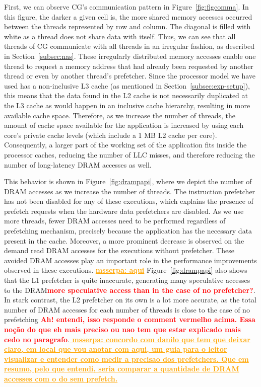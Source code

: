 \documentclass[AMA,final,STIX1COL]{WileyNJD-v2}
\newcommand{\ms}[1]{\textcolor{orange}{\bfseries \ul{ msserpa: #1} }\vspace{0.2cm}}
\newcommand{\vsg}[1]{\textcolor{blue}{\bfseries \ul{vsgirelli: #1} }\vspace{0.2cm}}
\newcommand{\fbm}[1]{\textcolor{red}{\bfseries \ul{fbm: #1} }\vspace{0.2cm}}
\begin{document}
First, we can observe CG's communication pattern in Figure~\ref{fig:figcomma}.
In this figure, the darker a given cell is, the more shared memory accesses occurred between the threads represented by row and column.
The diagonal is filled with white as a thread does not share data with itself.
Thus, we can see that all threads of CG communicate with all threads in an irregular fashion, as described in Section~\ref{subsec:nas}.
These irregularly distributed memory accesses enable one thread to request a memory address that had already been requested by another thread or even by another thread's prefetcher.
Since the processor model we have used has a non-inclusive L3 cache (as mentioned in Section~\ref{subsec:exp-setup}), this means that the data found in the L2 cache is not necessarily duplicated at the L3 cache as would happen in an inclusive cache hierarchy, resulting in more available cache space.
Therefore, as we increase the number of threads, the amount of cache space available for the application is increased by using each core's private cache levels (which include a 1 MB L2 cache per core).
Consequently, a larger part of the working set of the application fits inside the processor caches, reducing the number of LLC misses, and therefore reducing the number of long-latency DRAM accesses as well. 


This behavior is shown in Figure~\ref{fig:drampapi}, where we depict the number of DRAM accesses as we increase the number of threads.
The instruction prefetcher has not been disabled for any of these executions, which explains the presence of prefetch requests when the hardware data prefetchers are disabled.
As we use more threads, fewer DRAM accesses need to be performed regardless of prefetching mechanism, precisely because the application has the necessary data present in the cache.
Moreover, a more prominent decrease is observed on the demand read DRAM accesses for the executions without prefetcher.
These avoided DRAM accesses play an important role in the performance improvements observed in these executions.
\ms{aqui}
Figure~\ref{fig:drampapi} also shows that the L1 prefetcher is quite inaccurate, generating many speculative accesses to the DRAM\textcolor{red}{\textbf{more speculative access than in the case of no prefetcher?}}. In stark contrast, the L2 prefetcher on its own is a lot more accurate, as the total number of DRAM accesses for each number of threads is close to the case of no prefetching \textcolor{red}{\textbf{Ah! entendi, isso responde o comment vermelho acima. Essa noção do que eh mais preciso ou nao tem que estar explicado mais cedo no paragrafo}}.\ms{concordo com danilo que tem que deixar claro, em local que vou anotar com aqui, um guia para o leitor visualizar e entender como medir a precisao dos prefetchers. Que em resumo, pelo que entendi, seria comparar a quantidade de DRAM accesses com o do sem prefetch.}
\end{document}
